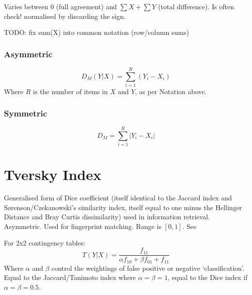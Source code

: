 \documentclass[11pt]{article}
\begin{document}
Varies between 0 (full agreement) and $\sum{X} + \sum{Y}$ (total difference). Is often {\color{red}  check!} normalised by discarding the sign.

{\color{red} TODO: fix sum(X) into common notation (row/column sums)}
\subsubsection{Asymmetric}
$$
D_M(Y|X) = \sum_{i=1}^{R}{ (Y_i - X_i) }
$$
Where $R$ is the number of items in $X$ and $Y$, as per Notation above.

\subsubsection{Symmetric}
$$
D_M = \sum_{i=1}^{R}{ |Y_i - X_i| }
$$















\section{Tversky Index}
Generalised form of Dice coefficient (itself identical to the Jaccard index and S\o renson/Czekanowski's similarity index, itself equal to one minus the Hellinger Distance and Bray Curtis dissimilarity) used in information retrieval.  Asymmetric. Used for fingerprint matching.  Range is $[0, 1]$.  See \cite{tversky1977features}




For 2x2 contingency tables:
$$
T(Y|X) = \frac{ f_{11} }{ \alpha f_{10} + \beta f_{01} + f_{11} }
$$
Where $\alpha$ and $\beta$ control the weightings of false positive or negative `classification'.  Equal to the Jaccard/Tanimoto index where $\alpha = \beta = 1$, equal to the Dice index if $\alpha = \beta = 0.5$.
\end{document}
